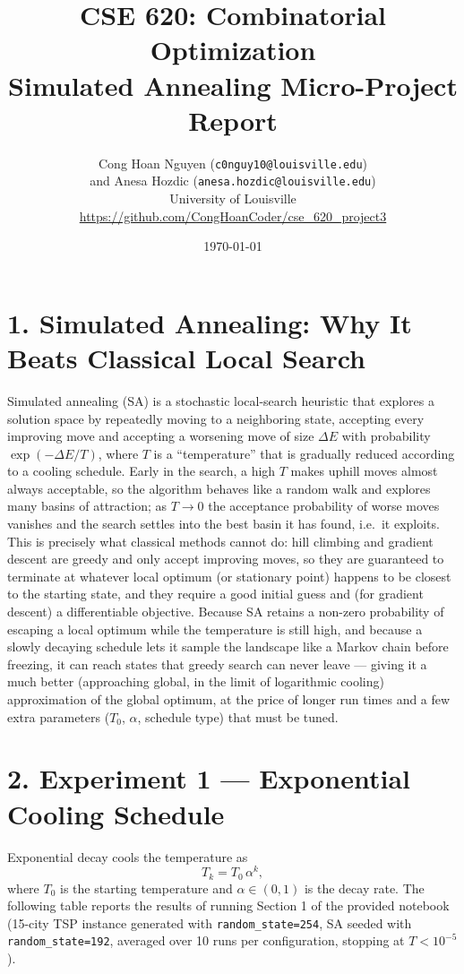 \documentclass[11pt]{article}
\title{CSE 620: Combinatorial Optimization\\
\large Simulated Annealing Micro-Project Report}
\author{Cong Hoan Nguyen (\texttt{c0nguy10@louisville.edu}) \\ and
Anesa Hozdic (\texttt{anesa.hozdic@louisville.edu}) \\ University of Louisville\\[6pt]
\href{https://github.com/CongHoanCoder/cse_620_project3}{https://github.com/CongHoanCoder/cse_620_project3}}
\date{\today}
\begin{document}
\maketitle

\section*{1. Simulated Annealing: Why It Beats Classical Local Search}

Simulated annealing (SA) is a stochastic local-search heuristic that explores a
solution space by repeatedly moving to a neighboring state, accepting every
improving move and accepting a worsening move of size $\Delta E$ with
probability $\exp(-\Delta E / T)$, where $T$ is a ``temperature'' that is
gradually reduced according to a cooling schedule. Early in the search, a high
$T$ makes uphill moves almost always acceptable, so the algorithm behaves like a
random walk and explores many basins of attraction; as $T \to 0$ the acceptance
probability of worse moves vanishes and the search settles into the best basin
it has found, i.e.\ it exploits. This is precisely what classical methods
cannot do: hill climbing and gradient descent are greedy and only accept
improving moves, so they are guaranteed to terminate at whatever local optimum
(or stationary point) happens to be closest to the starting state, and they
require a good initial guess and (for gradient descent) a differentiable
objective. Because SA retains a non-zero probability of escaping a local
optimum while the temperature is still high, and because a slowly decaying
schedule lets it sample the landscape like a Markov chain before freezing, it
can reach states that greedy search can never leave --- giving it a much better
(approaching global, in the limit of logarithmic cooling) approximation of the
global optimum, at the price of longer run times and a few extra parameters
($T_0$, $\alpha$, schedule type) that must be tuned.

\section*{2. Experiment 1 --- Exponential Cooling Schedule}

Exponential decay cools the temperature as
\begin{equation}
    T_k = T_0 \, \alpha^k ,
\end{equation}
where $T_0$ is the starting temperature and $\alpha \in (0,1)$ is the decay
rate. The following table reports the results of running Section 1 of the
provided notebook (15-city TSP instance generated with
\texttt{random\_state=254}, SA seeded with \texttt{random\_state=192}, averaged
over 10 runs per configuration, stopping at $T < 10^{-5}$).
\end{document}
